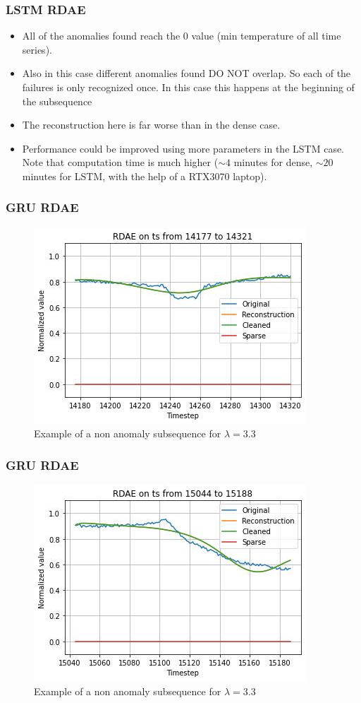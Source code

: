 \documentclass{beamer}
\theoremstyle{plain}
\theoremstyle{definition}
\theoremstyle{remark}
\begin{document}
\begin{frame}
	\frametitle{LSTM RDAE}
	\begin{itemize}
		\item All of the anomalies found reach the $0$ value (min temperature of all time series).
		\item Also in this case different anomalies found DO NOT overlap. So each of the failures is only recognized once. In this case this happens at the beginning of the subsequence
		\item The reconstruction here is far worse than in the dense case.
		\item Performance could be improved using more parameters in the LSTM case. Note that computation time is much higher ($\sim 4$ minutes for dense, $\sim 20$ minutes for LSTM, with the help of a RTX3070 laptop).
	\end{itemize}
\end{frame}

\begin{frame}
	\frametitle{GRU RDAE}
	\begin{figure}
		\centering
		\includegraphics[width=0.7\linewidth]{Images/GRUlam3.3ts_non_anomalyzoom14177.jpg}
		\caption[]{Example of a non anomaly subsequence for $\lambda=3.3$}
	\end{figure}
\end{frame}

\begin{frame}
	\frametitle{GRU RDAE}
	\begin{figure}
		\centering
		\includegraphics[width=0.7\linewidth]{Images/GRUlam3.3ts_non_anomalyzoom15044.jpg}
		\caption[]{Example of a non anomaly subsequence for $\lambda=3.3$}
	\end{figure}
\end{frame}
\end{document}
